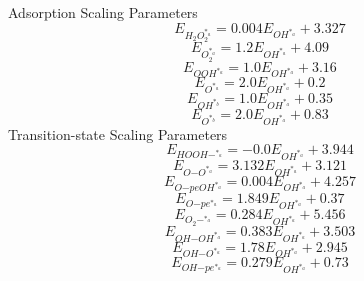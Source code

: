 \documentclass[a4paper,8pt]{report}
\begin{document}
Adsorption Scaling Parameters\\
\begin{equation}
\label{ads_scaling_1}
E_{H_{2}O_{2}^{*_a}} = 0.004E_{OH^{*_a}} + 3.327
\end{equation}
\begin{equation}
\label{ads_scaling_2}
E_{O_{2}^{*_a}} = 1.2E_{OH^{*_a}} + 4.09
\end{equation}
\begin{equation}
\label{ads_scaling_3}
E_{OOH^{*_a}} = 1.0E_{OH^{*_a}} + 3.16
\end{equation}
\begin{equation}
\label{ads_scaling_4}
E_{O^{*_a}} = 2.0E_{OH^{*_a}} + 0.2
\end{equation}
\begin{equation}
\label{ads_scaling_5}
E_{OH^{*_b}} = 1.0E_{OH^{*_a}} + 0.35
\end{equation}
\begin{equation}
\label{ads_scaling_6}
E_{O^{*_b}} = 2.0E_{OH^{*_a}} + 0.83
\end{equation}
Transition-state Scaling Parameters\\
\begin{equation}
\label{TS_scaling_1}
E_{HOOH\mathrm{-}^{*_a}} = -0.0E_{OH^{*_a}} + 3.944
\end{equation}
\begin{equation}
\label{TS_scaling_2}
E_{O\mathrm{-}O^{*_a}} = 3.132E_{OH^{*_a}} + 3.121
\end{equation}
\begin{equation}
\label{TS_scaling_3}
E_{O\mathrm{-}peOH^{*_a}} = 0.004E_{OH^{*_a}} + 4.257
\end{equation}
\begin{equation}
\label{TS_scaling_4}
E_{O\mathrm{-}pe^{*_a}} = 1.849E_{OH^{*_a}} + 0.37
\end{equation}
\begin{equation}
\label{TS_scaling_5}
E_{O_{2}\mathrm{-}^{*_a}} = 0.284E_{OH^{*_a}} + 5.456
\end{equation}
\begin{equation}
\label{TS_scaling_6}
E_{OH\mathrm{-}OH^{*_a}} = 0.383E_{OH^{*_a}} + 3.503
\end{equation}
\begin{equation}
\label{TS_scaling_7}
E_{OH\mathrm{-}O^{*_a}} = 1.78E_{OH^{*_a}} + 2.945
\end{equation}
\begin{equation}
\label{TS_scaling_8}
E_{OH\mathrm{-}pe^{*_a}} = 0.279E_{OH^{*_a}} + 0.73
\end{equation}
\end{document}
